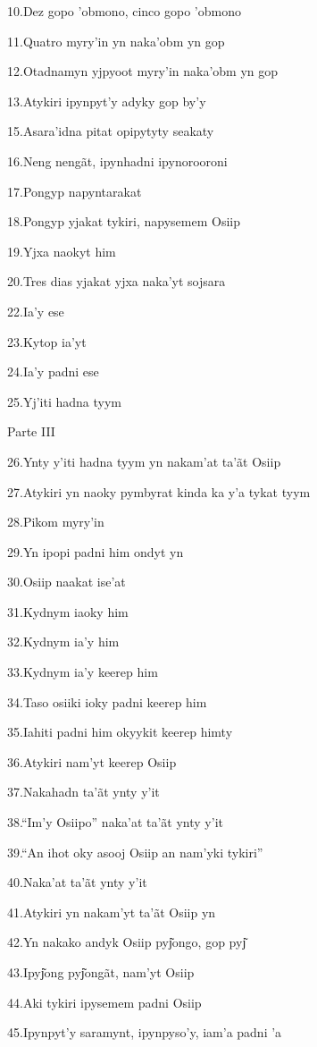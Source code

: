 10.Dez gopo 'obmono, cinco gopo 'obmono

11.Quatro myry'in yn naka'obm yn gop

12.Otadnamyn yjpyoot myry'in naka'obm yn gop

13.Atykiri ipynpyt'y adyky gop by'y

15.Asara'idna pitat opipytyty seakaty

16.Neng nengãt, ipynhadni ipynorooroni

17.Pongyp napyntarakat

18.Pongyp yjakat tykiri, napysemem Osiip

19.Yjxa naokyt him

20.Tres dias yjakat yjxa naka'yt sojsara

22.Ia'y ese

23.Kytop ia'yt

24.Ia'y padni ese

25.Yj'iti hadna tyym

Parte III

26.Ynty y'iti hadna tyym yn nakam'at ta'ãt Osiip

27.Atykiri yn naoky pymbyrat kinda ka y'a tykat tyym

28.Pikom myry'in

29.Yn ipopi padni him ondyt yn

30.Osiip naakat ise'at

31.Kydnym iaoky him

32.Kydnym ia'y him

33.Kydnym ia'y keerep him

34.Taso osiiki ioky padni keerep him

35.Iahiti padni him okyykit keerep himty

36.Atykiri nam'yt keerep Osiip

37.Nakahadn ta'ãt ynty y'it

38.``Im'y Osiipo'' naka'at ta'ãt ynty y'it

39.``An ihot oky asooj Osiip an nam'yki tykiri''

40.Naka'at ta'ãt ynty y'it

41.Atykiri yn nakam'yt ta'ãt Osiip yn

\protect\hypertarget{_heading=h.1t3h5sf}{}{}42.Yn nakako andyk Osiip
pyj͂ongo, gop pyj͂

43.Ipyj͂ong pyj͂ongãt, nam'yt Osiip

44.Aki tykiri ipysemem padni Osiip

45.Ipynpyt'y saramynt, ipynpyso'y, iam'a padni 'a

